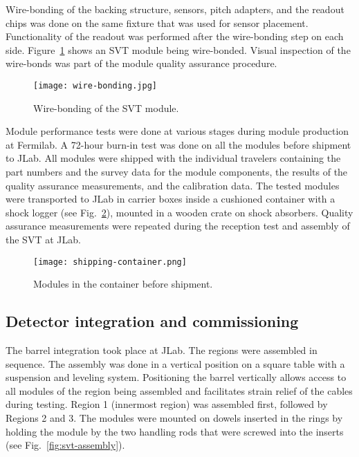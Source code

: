 Wire-bonding of the backing structure, sensors, pitch adapters, and the readout chips was done on the same fixture that was used for sensor placement. Functionality of the readout was performed after the wire-bonding step on each side. Figure~\ref{fig:wire-bonding} shows an SVT module being wire-bonded. Visual inspection of the wire-bonds was part of the module quality assurance procedure.

\begin{figure}[hbt] 
\centering 
\texttt{[image: wire-bonding.jpg]}
\caption{Wire-bonding of the SVT module.}
\label{fig:wire-bonding}
\end{figure}

Module performance tests were done at various stages during module production at Fermilab. A 72-hour burn-in test was done on all the modules before shipment to JLab. All modules were shipped with the individual travelers containing the part numbers and the survey data for the module components, the results of the quality assurance measurements, and the calibration data. The tested modules were transported to JLab in carrier boxes inside a cushioned container with a shock logger (see Fig.~\ref{fig:shipping-container}), mounted in a wooden crate on shock absorbers. Quality assurance measurements were repeated during the reception test and assembly of the SVT at JLab. 

\begin{figure}[hbt] 
\centering 
\texttt{[image: shipping-container.png]}
\caption{Modules in the container before shipment.}
\label{fig:shipping-container}
\end{figure}

\subsection{Detector integration and commissioning}

The barrel integration took place at JLab. The regions were assembled in sequence. The assembly was done in a vertical position on a square table with a suspension and leveling system. Positioning the barrel vertically allows access to all modules of the region being assembled and facilitates strain relief of the cables during testing. Region 1 (innermost region) was assembled first, followed by Regions 2 and 3. The modules were mounted on dowels inserted in the rings by holding the module by the two handling rods that were screwed into the inserts (see Fig.~\ref{fig:svt-assembly}). 

